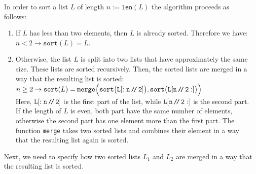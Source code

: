 In order to sort a list $L$ of length $n := \mathtt{len}(L)$ the algorithm proceeds as follows:
\begin{enumerate}
\item If $L$ has less than two elements, then $L$ is already sorted.  Therefore we have: 
      \\[0.2cm]
      \hspace*{1.3cm}
      $n < 2 \rightarrow \mathtt{sort}(L) = L$.
\item Otherwise, the list $L$ is split into two lists that have approximately the same size.
      These lists are sorted recursively.  Then, the sorted lists are merged in a way that the
      resulting list is sorted: \\[0.2cm]
      \hspace*{1.3cm} 
      $n \geq 2 \rightarrow \mathtt{sort}(L) =
         \mathtt{merge}\Bigl(\mathtt{sort}\bigl(\mathtt{L[:n\mbox{\,\texttt{/}$\!$\texttt{/}\,} 2]}\bigr),
         \mathtt{sort}\bigl(\mathtt{L[n\mbox{\,\texttt{/}$\!$\texttt{/}\,} 2:]}\bigr)\Bigr)
     $
      \\[0.2cm]
      Here,  $\mathtt{L[:n\mbox{\,\texttt{/}$\!$\texttt{/}\,} 2]}$ is the first part of the list, while
      $\mathtt{L[n\mbox{\,\texttt{/}$\!$\texttt{/}\,} 2:]}$ is the second part.  If the length of $L$ is even, both part have the same number of
      elements, otherwise the second part has one element more than the first part.  The function \texttt{merge}
      takes two sorted lists and combines their element in a way that the resulting list again is sorted.
\end{enumerate}
Next, we need to specify how two sorted lists $L_1$ and $L_2$ are merged in a way that the resulting list
is sorted.
